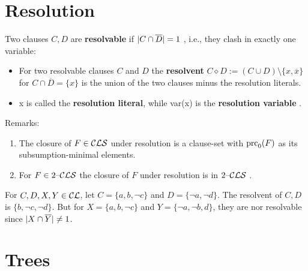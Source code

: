 \documentclass[12pt]{book}
\begin{document}
\section{Resolution}
\label{sec:Resolution}

\begin{defi}\label{def:Resolution}
 Two clauses $C,D$ are \textbf{resolvable} if $\lvert C \cap \overline D \rvert = 1$ , i.e., they clash in exactly one variable:
\begin{itemize}
 \item For two resolvable clauses $C$ and $D$ the \textbf{resolvent} $C \diamond D := (C \cup D) \setminus \{x, \overline x\} $ for $C \cap \overline D = \{ x \}$ 
 is the union of the two clauses minus the resolution literals.
 \item x is called the \textbf{resolution literal}, while var(x) is the \textbf{resolution variable} \cite{h5}.
 \end{itemize}
 \end{defi}
 
 Remarks:
\begin{enumerate}
\item The closure of $F \in \mathcal{CLS}$ under resolution is a clause-set with $\operatorname{prc}_0(F)$ as its subsumption-minimal elements.
\item For $F \in 2\mbox{--}\mathcal{CLS}$ the closure of $F$ under resolution is in $2\mbox{--}\mathcal{CLS}$ \cite{h5}.
\end{enumerate}

\begin{examp}\label{exp:resolution1}
       For $C,D,X,Y \in \mathcal{CL}$, let $C=\{a,b, \neg c\}$ and $D=\{\neg a, \neg d\}$. The resolvent of $C,D$ is $\{b, \neg c, \neg d\}$.
	   But for $X=\{a,b, \neg c\}$ and $Y=\{\neg a, \neg b, d\}$, they are nor resolvable since $\lvert X \cap \overline Y  \rvert \not = 1$.
\end{examp}
\section{Trees}
\label{sec:Trees}
\end{document}
